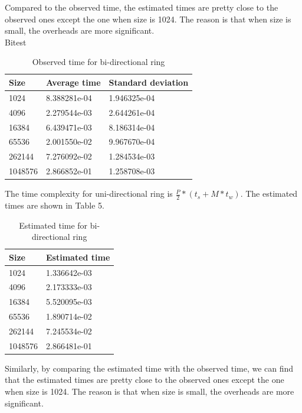 \documentclass[10pt,letterpaper]{article}
\begin{document}
\begin{enumerate}[(a)]
Compared to the observed time, the estimated times are pretty close to the observed ones except the one when size is 1024. The reason is that when size is small, the overheads are more significant.\\[10pt]
Bitest\\[10pt]
\begin{table}[h]
\centering
\begin{tabular}{lll}\hline
Size    & Average time & Standard deviation \\\hline
1024    & 8.388281e-04 & 1.946325e-04       \\
4096    & 2.279544e-03 & 2.644261e-04       \\
16384   & 6.439471e-03 & 8.186314e-04       \\
65536   & 2.001550e-02 & 9.967670e-04       \\
262144  & 7.276092e-02 & 1.284534e-03       \\
1048576 & 2.866852e-01 & 1.258708e-03      \\\hline
\end{tabular}
\caption{Observed time for bi-directional ring}
\end{table}



The time complexity for uni-directional ring is $\frac{P}{2}*(t_s+M*t_w)$. The estimated times are shown in Table 5.
\begin{table}[h]
\centering
\begin{tabular}{ll}\hline
Size    & Estimated time \\\hline
1024    & 1.336642e-03   \\
4096    & 2.173333e-03   \\
16384   & 5.520095e-03   \\
65536   & 1.890714e-02   \\
262144  & 7.245534e-02   \\
1048576 & 2.866481e-01  \\\hline
\end{tabular}
\caption{Estimated time for bi-directional ring}
\end{table}


 Similarly, by comparing the estimated time with the observed time, we can find that the estimated times are pretty close to the observed ones except the one when size is 1024. The reason is that when size is small, the overheads are more significant.


\end{enumerate}
\end{document}
